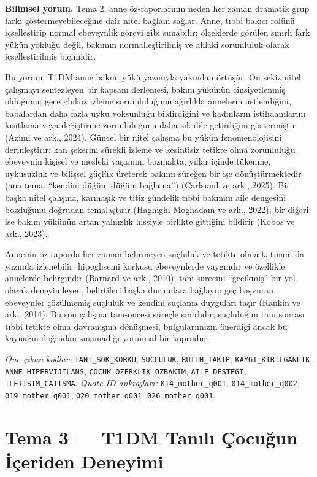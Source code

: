 \documentclass[
  turkish,
  a4paper,
  DIV=11,
  numbers=noendperiod]{scrreprt}
\begin{document}
\textbf{Bilimsel yorum.} Tema 2, anne öz-raporlarının neden her zaman
dramatik grup farkı göstermeyebileceğine dair nitel bağlam sağlar. Anne,
tıbbi bakıcı rolünü içselleştirip normal ebeveynlik görevi gibi
sunabilir; ölçeklerde görülen sınırlı fark yükün yokluğu değil, bakımın
normalleştirilmiş ve ahlaki sorumluluk olarak içselleştirilmiş
biçimidir.

Bu yorum, T1DM anne bakım yükü yazınıyla yakından örtüşür. On sekiz
nitel çalışmayı sentezleyen bir kapsam derlemesi, bakım yükünün
cinsiyetlenmiş olduğunu; gece glukoz izleme sorumluluğunu ağırlıkla
annelerin üstlendiğini, babalardan daha fazla uyku yoksunluğu
bildirdiğini ve kadınların istihdamlarını kısıtlama veya değiştirme
zorunluluğunu daha sık dile getirdiğini göstermiştir (Azimi ve ark.,
2024). Güncel bir nitel çalışma bu yükün fenomenolojisini derinleştirir:
kan şekerini sürekli izleme ve kesintisiz tetikte olma zorunluluğu
ebeveynin kişisel ve mesleki yaşamını bozmakta, yıllar içinde tükenme,
uykusuzluk ve bilişsel güçlük üreterek bakımı süreğen bir işe
dönüştürmektedir (ana tema: ``kendini düğüm düğüm bağlama'') (Carlsund
ve ark., 2025). Bir başka nitel çalışma, karmaşık ve titiz gündelik
tıbbi bakımın aile dengesini bozduğunu doğrudan temalaştırır (Haghighi
Moghadam ve ark., 2022); bir diğeri ise bakım yükünün artan yalnızlık
hissiyle birlikte gittiğini bildirir (Kobos ve ark., 2023).

Annenin öz-raporda her zaman belirmeyen suçluluk ve tetikte olma katmanı
da yazında izlenebilir: hipoglisemi korkusu ebeveynlerde yaygındır ve
özellikle annelerde belirgindir (Barnard ve ark., 2010); tanı sürecini
``gecikmiş'' bir yol olarak deneyimleyen, belirtileri başka durumlara
bağlayıp geç başvuran ebeveynler çözülmemiş suçluluk ve kendini suçlama
duyguları taşır (Rankin ve ark., 2014). Bu son çalışma tanı-öncesi
süreçle sınırlıdır; suçluluğun tanı sonrası tıbbi tetikte olma
davranışına dönüşmesi, bulgularımızın önerdiği ancak bu kaynağın
doğrudan sınamadığı yorumsal bir köprüdür.

\emph{Öne çıkan kodlar:} \texttt{TANI\_SOK\_KORKU}, \texttt{SUCLULUK},
\texttt{RUTIN\_TAKIP}, \texttt{KAYGI\_KIRILGANLIK},
\texttt{ANNE\_HIPERVIJILANS}, \texttt{COCUK\_OZERKLIK\_OZBAKIM},
\texttt{AILE\_DESTEGI}, \texttt{ILETISIM\_CATISMA}. \emph{Quote ID
ankrajları:} \texttt{014\_mother\_q001}, \texttt{014\_mother\_q002},
\texttt{019\_mother\_q001}, \texttt{020\_mother\_q001},
\texttt{026\_mother\_q001}.

\section{Tema 3 --- T1DM Tanılı Çocuğun İçeriden Deneyimi}\label{tema-3}
\end{document}
